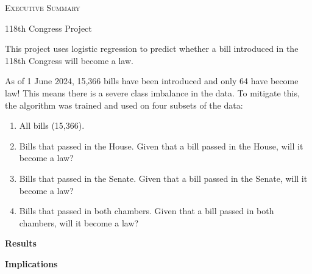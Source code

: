 \documentclass[12pt]%
{article}
\begin{document}
\begin{center}
{\Large \textsc{Executive Summary}}

\vspace{0.5pc}
118th Congress Project

\end{center}

\vspace{1.5pc}
This project uses logistic regression to predict whether a bill introduced in the 118th Congress will become a law.  

\vspace{0.5pc}
As of 1 June 2024, 15,366 bills have been introduced and only 64 have become law!  This means there is a severe class imbalance in the data.  To mitigate this, the algorithm was trained and used on four subsets of the data:
\begin{enumerate}
\item All bills (15,366).
\item Bills that passed in the House.  Given that a bill passed in the House, will it become a law?
\item Bills that passed in the Senate.  Given that a bill passed in the Senate, will it become a law?
\item Bills that passed in both chambers.  Given that a bill passed in both chambers, will it become a law?
\end{enumerate}

\vspace{1pc}
\begin{center}
{\large\textbf{Results}}
\end{center}  


\vspace{0.75pc}
\begin{center}
{\large\textbf{Implications}}
\end{center}
\end{document}
